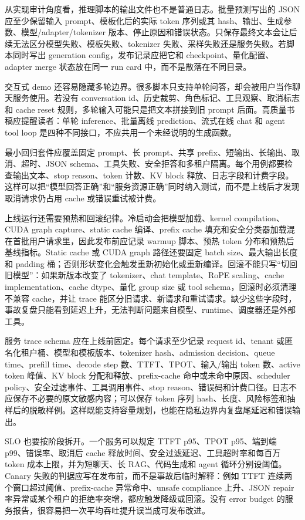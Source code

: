 \documentclass[UTF8,zihao=-4,openany]{ctexbook}
\begin{document}
从实现审计角度看，推理脚本的输出文件也不是普通日志。批量预测写出的 JSON 应至少保留输入 prompt、模板化后的实际 token 序列或其 hash、输出、生成参数、模型/adapter/tokenizer 版本、停止原因和错误状态。只保存最终文本会让后续无法区分模型失败、模板失败、tokenizer 失败、采样失败还是服务失败。若脚本同时写出 generation config，发布记录应把它和 checkpoint、量化配置、adapter merge 状态放在同一 run card 中，而不是散落在不同目录。

交互式 demo 还容易隐藏多轮边界。很多脚本只支持单轮问答，却会被用户当作聊天服务使用。若没有 conversation id、历史裁剪、角色标记、工具观察、取消标志和 cache reset 规则，多轮输入可能只是把文本拼接到旧 prompt 后面。高质量书稿应提醒读者：单轮 inference、批量离线 prediction、流式在线 chat 和 agent tool loop 是四种不同接口，不应共用一个未经说明的生成函数。

最小回归套件应覆盖固定 prompt、长 prompt、共享 prefix、短输出、长输出、取消、超时、JSON schema、工具失败、安全拒答和多租户隔离。每个用例都要检查输出文本、stop reason、token 计数、KV block 释放、日志字段和计费字段。这样可以把“模型回答正确”和“服务资源正确”同时纳入测试，而不是上线后才发现取消请求仍占用 cache 或错误重试被计费。

上线运行还需要预热和回滚纪律。冷启动会把模型加载、kernel compilation、CUDA graph capture、static cache 编译、prefix cache 填充和安全分类器加载混在首批用户请求里，因此发布前应记录 warmup 脚本、预热 token 分布和预热后基线指标。Static cache 或 CUDA graph 路径还要固定 batch size、最大输出长度和 padding 桶；否则形状变化会触发重新初始化或重新编译。回滚不能只写“切回旧模型”：如果新版本改变了 tokenizer、chat template、RoPE scaling、cache implementation、cache dtype、量化 group size 或 tool schema，回滚时必须清理不兼容 cache，并让 trace 能区分旧请求、新请求和重试请求。缺少这些字段时，事故复盘只能看到延迟上升，无法判断问题来自模型、runtime、调度器还是外部工具。

服务 trace schema 应在上线前固定。每个请求至少记录 request id、tenant 或匿名化租户桶、模型和模板版本、tokenizer hash、admission decision、queue time、prefill time、decode step 数、TTFT、TPOT、输入/输出 token 数、active token 峰值、KV block 分配和释放、prefix-cache 命中或未命中原因、scheduler policy、安全过滤事件、工具调用事件、stop reason、错误码和计费口径。日志不应保存不必要的原文敏感内容；可以保存 token 序列 hash、长度、风险标签和抽样后的脱敏样例。这样既能支持容量规划，也能在隐私边界内复盘尾延迟和错误输出。

SLO 也要按阶段拆开。一个服务可以规定 TTFT p95、TPOT p95、端到端 p99、错误率、取消后 cache 释放时间、安全过滤延迟、工具超时率和每百万 token 成本上限，并为短聊天、长 RAG、代码生成和 agent 循环分别设阈值。Canary 失败的判据应写在发布前，而不是事故后临时解释：例如 TTFT 连续两个窗口超过阈值、prefix-cache 异常命中、unsafe compliance 上升、JSON repair 率异常或某个租户的拒绝率突增，都应触发降级或回滚。没有 error budget 的服务报告，很容易把一次平均吞吐提升误当成可发布改进。
\end{document}
